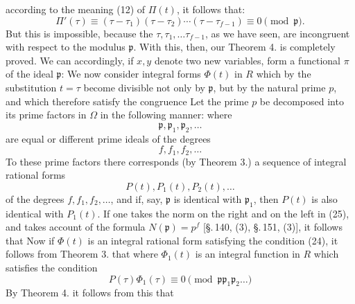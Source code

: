 according to the meaning (12) of $\Pi(t)$, it follows that:
\[ \Pi'(\tau) \equiv (\tau-\tau_1)(\tau-\tau_2) \cdots (\tau-\tau_{f-1}) \equiv 0 \pmod{\mathfrak p}. \]
But this is impossible, because the $\tau, \tau_1, \ldots \tau_{f-1}$, as we have seen, are incongruent with respect to the modulus $\mathfrak p$. With this, then, our Theorem 4. is completely proved. We can accordingly, if $x, y$ denote two new variables, form a functional $\pi$ of the ideal $\mathfrak p$:
We now consider integral forms $\Phi(t)$ in $R$ which by the substitution $t=\tau$ become divisible not only by $\mathfrak p$, but by the natural prime $p$, and which therefore satisfy the congruence
Let the prime $p$ be decomposed into its prime factors in $\Omega$ in the following manner:
where
\[ \mathfrak p, \mathfrak p_1, \mathfrak p_2, \ldots \]
are equal or different prime ideals of the degrees
\[ f, f_1, f_2, \ldots \]
To these prime factors there corresponds (by Theorem 3.) a sequence of integral rational forms
\[ P(t), P_1(t), P_2(t), \ldots \]
of the degrees $f, f_1, f_2, \ldots$, and if, say, $\mathfrak p$ is identical with $\mathfrak p_1$, then $P(t)$ is also identical with $P_1(t)$. If one takes the norm on the right and on the left in (25), and takes account of the formula $N(\mathfrak p) = p^f$ [\S.\,140, (3), \S.\,151, (3)], it follows that
Now if $\Phi(t)$ is an integral rational form satisfying the condition (24), it follows from Theorem 3. that
where $\Phi_1(t)$ is an integral function in $R$ which satisfies the condition
\[ P(\tau) \Phi_1(\tau) \equiv 0 \pmod{\mathfrak p \mathfrak p_1 \mathfrak p_2 \ldots} \]
By Theorem 4. it follows from this that
